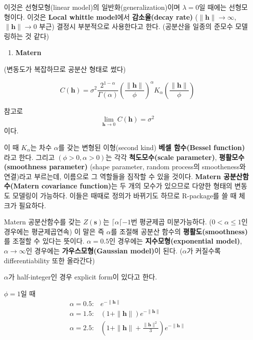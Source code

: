 \documentclass[b5paper,]{book}
\providecommand{\tightlist}{%
  \setlength{\itemsep}{0pt}\setlength{\parskip}{0pt}}
\theoremstyle{definition}
\theoremstyle{definition}
\theoremstyle{definition}
\theoremstyle{remark}
\begin{document}
이것은 선형모형(linear model)의 일반화(generalization)이며
\(\lambda=0\)일 때에는 선형모형이다. 이것은 \textbf{Local whittle
model}에서 \textbf{감소율(decay rate)}
(\(\| \mathbf{h} \| \rightarrow \infty\),
\(\| \mathbf{h} \| \rightarrow 0\) 부근) 결정시 부분적으로 사용한다고
한다. (공분산을 일종의 준모수 모델링하는 것 같다)

\begin{enumerate}
\def\labelenumi{\arabic{enumi}.}
\setcounter{enumi}{8}
\tightlist
\item
  \textbf{Matern}
\end{enumerate}

(변동도가 복잡하므로 공분산 형태로 썼다)

\[C(\mathbf{h})=\sigma^{2}\frac{2^{1-\alpha}}{\Gamma(\alpha)}(\frac{\|\mathbf{h}\|}{\phi})^{\alpha}K_{\alpha}(\frac{\|\mathbf{h}\|}{\phi})\]

참고로 \[\lim_{\mathbf{h} \rightarrow 0}C(\mathbf{h}) = \sigma^{2}\]
이다.

이 때 \(K_{\alpha}\)는 차수 \(\alpha\)를 갖는 변형된 이형(second kind)
\textbf{베셀 함수(Bessel function)}라고 한다. 그리고
\((\phi>0,\alpha>0)\)는 각각 \textbf{척도모수(scale parameter)},
\textbf{평활모수(smoothness parameter)} (shape parameter, random
process의 smootheness와 연결)라고 부르는데, 이름으로 그 역할들을 짐작할
수 있을 것이다. \textbf{Matern 공분산함수(Matern covariance function)}는
두 개의 모수가 있으므로 다양한 형태의 변동도 모델링이 가능하다. 이들은
때때로 정의가 바뀌기도 하므로 R-package를 쓸 때 체크가 필요하다.

Matern 공분산함수를 갖는 \(Z(\mathbf{s})\)는
\(\lceil \alpha \lceil -1\)번 평균제곱 미분가능하다.
(\(0<\alpha \leq 1\)인 경우에는 평균제곱연속) 이 말은 즉 \(\alpha\)를
조절해 공분산 함수의 \textbf{평활도(smoothness)}를 조절할 수 있다는
뜻이다. \(\alpha=0.5\)인 경우에는 \textbf{지수모형(exponential model)},
\(\alpha \rightarrow \infty\)인 경우에는 \textbf{가우스모형(Gaussian
model)}이 된다. (\(\alpha\)가 커질수록 differentiability 또한 올라간다)

\(\alpha\)가 half-integer인 경우 explicit form이 있다고 한다.

\(\phi=1\)일 때 \[
\begin{array}{ll}
\alpha=0.5: & e^{-\|\mathbf{h}\|}\\
\alpha=1.5: & (1+\|\mathbf{h}\|)e^{-\|\mathbf{h}\|}\\
\alpha=2.5: & (1+\|\mathbf{h}\| + \frac{\|\mathbf{h}\|^{2}}{3})e^{-\|\mathbf{h}\|}\\
\end{array}
\]
\end{document}
